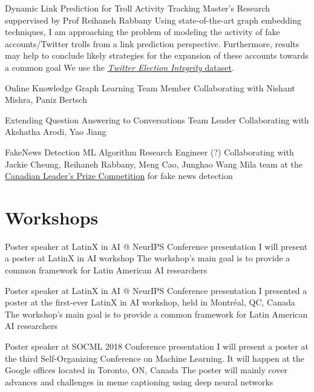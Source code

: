 \documentclass[8pt,a4paper,sans]{moderncv} %
\begin{document}
        {Dynamic Link Prediction for Troll Activity Tracking}
        {Master's Research}
        {suppervised by Prof Reihaneh Rabbany}
        {Using state-of-the-art graph embedding techniques, I am approaching the problem
          of modeling the activity of fake accounts/Twitter trolls from a link prediction
          perspective. Furthermore, results may help to conclude likely strategies for
          the expansion of these accounts towards a common goal}
        {We use the \href{https://transparency.twitter.com/en/reports/information-operations.html}{\emph{Twitter Election Integrity} dataset}.}
        
        {Online Knowledge Graph Learning}
        {Team Member}
        {Collaborating with Nishant Mishra, Paniz Bertsch}
        {}
        {}

        {Extending Question Answering to Conversations}
        {Team Leader}
        {Collaborating with Akshatha Arodi, Yao Jiang}
        {}
        {}

        {FakeNews Detection}
        {ML Algorithm Research Engineer (?)}
        {Collaborating with Jackie Cheung, Reihaneh Rabbany, Meng Cao, Junghao Wang}
        {Mila team at the \href{https://leadersprize.truenorthwaterloo.com/en/}{Canadian Leader's Prize Competition}
         for fake news detection}
        {}

\section{Workshops}

        {Poster speaker at LatinX in AI @ NeurIPS}
        {Conference presentation}
        {I will present a poster at LatinX in AI workshop}
        {The workshop's main goal is to provide a common framework for Latin American AI researchers}
        {}

        {Poster speaker at LatinX in AI @ NeurIPS}
        {Conference presentation}
        {I presented a poster at the first-ever LatinX in AI workshop, held in Montréal, QC, Canada}
        {The workshop's main goal is to provide a common framework for Latin American AI researchers}
        {}

        {Poster speaker at SOCML 2018}
        {Conference presentation}
        {I will present a poster at the third Self-Organizing Conference on Machine Learning. It will happen at the Google offices located in Toronto, ON, Canada}
        {The poster will mainly cover advances and challenges in meme captioning using deep neural networks}
        {}
\end{document}
